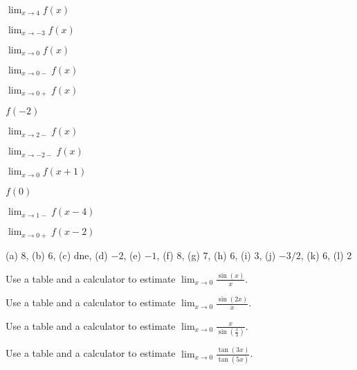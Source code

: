 \begin{exercises}
\begin{exercise}
\begin{marginfigure}
\caption{A piecewise defined function.}
\label{plot:piecewise-exercise}
\end{marginfigure}
\begin{enumerate}
\begin{multicols}{3}
\item $\lim_{x\to 4} f(x)$  
\item $\lim_{x\to -3} f(x)$  
\item $\lim_{x\to 0} f(x)$ 
\item $\lim_{x\to 0-} f(x)$  
\item $\lim_{x\to 0+} f(x)$  
\item $f(-2)$  
\item $\lim_{x\to 2-} f(x)$  
\item $\lim_{x\to -2-} f(x)$  
\item $\lim_{x\to 0} f(x+1)$  
\item $f(0)$ 
\item $\lim_{x\to 1-} f(x-4)$  
\item $\lim_{x\to 0+} f(x-2)$
\end{multicols}  
\end{enumerate}
\begin{answer} (a) $8$, (b) $6$, (c) dne, (d) $-2$, (e) $-1$, (f) $8$,
 (g) $7$, (h) $6$, (i) $3$, (j) $-3/2$, (k) $6$, (l) $2$
\end{answer}
\end{exercise}


\begin{exercise} 
Use a table and a calculator to estimate $\lim_{x\to 0}
\frac{\sin(x)}{x}$.
\end{exercise}

\begin{exercise} 
Use a table and a calculator to estimate $\lim_{x\to 0} \frac{\sin(2x)}{x}$.
\end{exercise}

\begin{exercise} 
Use a table and a calculator to estimate $\lim_{x\to 0} \frac{x}{\sin\left(\frac{x}{3}\right)}$.
\end{exercise}

\begin{exercise} 
Use a table and a calculator to estimate $\lim_{x\to
  0}\frac{\tan(3x)}{\tan(5x)}$.
\end{exercise}


\end{exercises}
